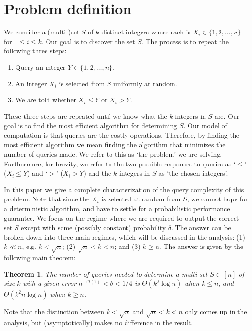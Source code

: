 \documentclass[12pt]{article}
\newtheorem{theorem}{Theorem}
\newcommand{\Ta}{\Theta}
\newcommand{\de}{\delta}
\begin{document}
\section{Problem definition} \label{sec:description}
We consider a (multi-)set $S$ of $k$ distinct integers where each is $X_i \in \{1, 2, \ldots, n\}$ for $1 \le i \le k$. Our goal is to discover the set $S$. The process is to repeat the following three steps: 
\begin{enumerate}
	\item Query an integer $Y \in \{1, 2, \ldots, n\}$.
	\item An integer $X_i$ is selected from $S$ uniformly at random.
	\item We are told whether $X_i \leq Y$ or $X_i > Y$.
\end{enumerate}
These three steps are repeated until we know what the $k$ integers in $S$ are. Our goal is to find the most efficient algorithm for determining $S$. Our model of computation is that queries are the costly operations. Therefore, by finding the most efficient algorithm we mean finding the algorithm that minimizes the number of queries made. We refer to this as `the problem' we are solving. Furthermore, for brevity, we refer to the two possible responses to queries as `$\leq$' ($X_i \leq Y$) and `$>$' ($X_i > Y$) and the $k$ integers in $S$ as `the chosen integers'. 

In this paper we give a complete characterization of the query complexity of this problem. 
Note that since the $X_i$ is selected at random from $S$, we cannot hope for a deterministic algorithm, and have to settle for a probabilistic performance guarantee. 
We focus on the regime where we are required to output the correct set $S$ except with some (possibly constant) probability $\de$. 
The answer can be broken down into three main regimes, which will 
be discussed in the analysis: (1) $k\ll n$, e.g. $k<\sqrt{n}$; (2) $\sqrt{n} < k < n$; and (3) $k\ge n$. 
The answer is given by the following main theorem:

\begin{theorem}
\label{thm:main1}
The number of queries needed to determine a multi-set $S\subset [n]$ of size $k$ with a given error $n^{-O(1)}<\de<1/4$ is $\Ta(k^3\log n)$ when $k\le n$, and $\Ta(k^2 n \log n)$ when $k\ge n$. 
\end{theorem}

Note that the distinction between $k<\sqrt{n}$ and $\sqrt{n}<k<n$ only comes up in the analysis, but (asymptotically) makes no difference in the result. 
\end{document}
